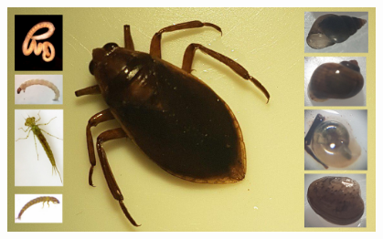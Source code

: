 \documentclass[final]{beamer}
\newlength{\sepmargin}
\newlength{\onecolwid}
\begin{document}
\begin{frame}[t]
\begin{columns}[t]
\begin{column}{\onecolwid}
\begin{block}{ }
                \begin{figure}
                    \includegraphics[width=1.0\linewidth]{popu.jpg}
				\end{figure}
                
		\end{block}
      \end{column}
      
      \begin{column}{\sepmargin} \end{column}
      \end{columns} 
       
      \begin{columns}[t] %
      

\end{columns}
\end{frame}
\end{document}
